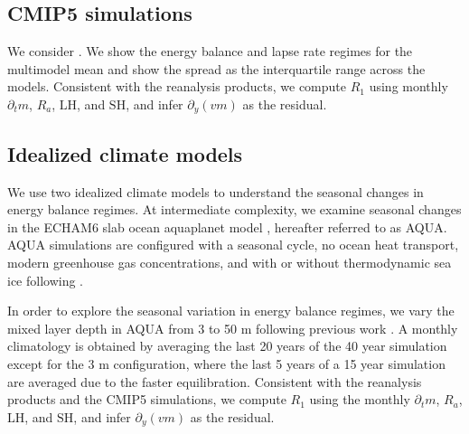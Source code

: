 \documentclass{ametsocV5}
\begin{document}
    \subsection{CMIP5 simulations}\label{subsec:cmip}
    We consider  \citep[Table~B1,][]{taylor2012}. We show the energy balance and lapse rate regimes for the multimodel mean and show the spread as the interquartile range across the models. Consistent with the reanalysis products, we compute $R_1$ using monthly $\partial_t m$, $R_a$, $\mathrm{LH}$, and $\mathrm{SH}$, and infer $\partial_y (vm) $ as the residual.

    \subsection{Idealized climate models}\label{subsec:models}
    We use two idealized climate models to understand the seasonal changes in energy balance regimes. At intermediate complexity, we examine seasonal changes in the ECHAM6 slab ocean aquaplanet model \citep{stevens2013}, hereafter referred to as AQUA. AQUA simulations are configured with a seasonal cycle, no ocean heat transport, modern greenhouse gas concentrations, and with or without thermodynamic sea ice following \cite{shaw2020}. 
    
    In order to explore the seasonal variation in energy balance regimes, we vary the mixed layer depth in AQUA from 3 to 50 m following previous work \citep{donohoe2014, barpanda2020, shaw2020}. A monthly climatology is obtained by averaging the last 20 years of the 40 year simulation except for the 3 m configuration, where the last 5 years of a 15 year simulation are averaged due to the faster equilibration. Consistent with the reanalysis products and the CMIP5 simulations, we compute $R_1$ using the monthly $\partial_t m$, $R_a$, $\mathrm{LH}$, and $\mathrm{SH}$, and infer $\partial_y (vm) $ as the residual.
\end{document}
